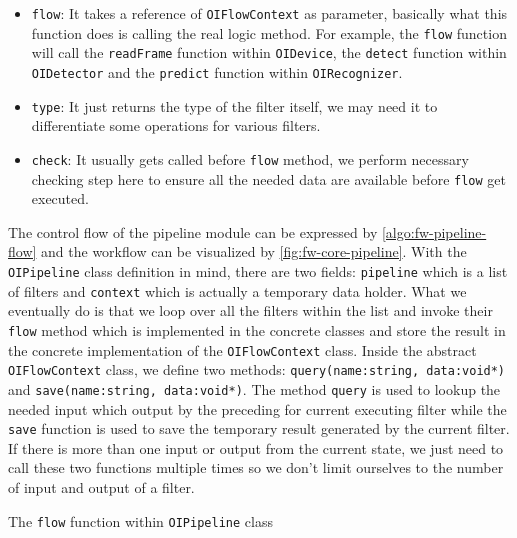 \begin{itemize}
    \item \texttt{flow}: It takes a reference of \texttt{OIFlowContext} as
    parameter, basically what this function does is calling the real logic
    method. For example, the \texttt{flow} function will call the
    \texttt{readFrame} function within \texttt{OIDevice}, the \texttt{detect}
    function within \texttt{OIDetector} and the \texttt{predict} function
    within \texttt{OIRecognizer}.

    \item \texttt{type}: It just returns the type of the filter itself, we may
    need it to differentiate some operations for various filters.

    \item \texttt{check}: It usually gets called before \texttt{flow} method,
    we perform necessary checking step here to ensure all the needed data are
    available before \texttt{flow} get executed.
\end{itemize}

The control flow of the pipeline module can be expressed by
\autoref{algo:fw-pipeline-flow} and the workflow can be visualized by
\autoref{fig:fw-core-pipeline}. With the \texttt{OIPipeline} class
definition in mind, there are two fields: \texttt{pipeline} which is a list of
filters and \texttt{context} which is actually a temporary data holder.
What we eventually do is that we loop over all the filters within the list and
invoke their \texttt{flow} method which is implemented in the concrete
classes and store the result in the concrete implementation of the
\texttt{OIFlowContext} class.
Inside the abstract \texttt{OIFlowContext} class, we define two methods:
\texttt{query(name:string, data:void*)} and \texttt{save(name:string,
data:void*)}. The method \texttt{query} is used to lookup the needed input
which output by the preceding for current executing filter while the
\texttt{save} function is used to save the temporary result generated by
the current filter. If there is more than one input or output from the current state,
we just need to call these two functions multiple times so we don't limit
ourselves to the number of input and output of a filter.

\begin{algorithm}
    \caption{The \texttt{flow} function within \texttt{OIPipeline} class}
    \label{algo:fw-pipeline-flow}
\end{algorithm}


